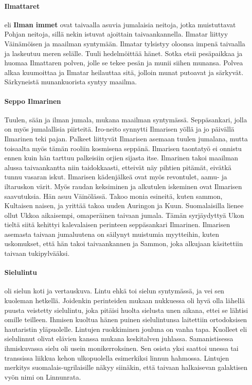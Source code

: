   \paragraph{Ilmattaret} eli \textbf{Ilman immet} ovat taivaalla asuvia jumalaisia neitoja, jotka 
    muistuttavat Pohjan neitoja, sillä nekin istuvat ajoittain taivaankannella. Ilmatar liittyy 
    Väinämöisen ja maailman syntymään. Ilmatar tylsistyy oloonsa impenä taivaalla ja laskeutuu 
    meren selälle. Tuuli hedelmöittää hänet. Sotka etsii pesäpaikkaa ja huomaa Ilmattaren polven, 
    jolle se tekee pesän ja munii siihen munansa. Polvea alkaa kuumoittaa ja Ilmatar heilauttaa 
    sitä, jolloin munat putoavat ja särkyvät. Särkyneistä munankuorista syntyy maailma. 
  \paragraph{Seppo Ilmarinen} Tuulen, sään ja ilman jumala, mukana maailman syntymässä. 
    Seppäsankari, jolla on myös jumalallisia piirteitä. Iro-neito synnytti Ilmarisen yöllä ja jo 
    päivällä Ilmarinen teki pajan. Palkeet liittyvät Ilmarisen asemaan tuulen jumalana, mutta 
    toisaalta myös tämän rooliin kosmisena seppänä. Ilmarisen taontatyö ei onnistu ennen kuin hän 
    tarttuu palkeisiin orjien sijasta itse.  Ilmarinen takoi maailman alussa taivaankantta niin 
    taidokkaasti, etteivät näy pihtien pitämät, eivätkä tunnu vasaran iskut. Ilmarisen 
    kädenjälkeä ovat myös revontulet, aamu- ja iltaruskon värit. Myös raudan keksiminen ja 
    alkutulen iskeminen ovat Ilmarisen saavutuksia. Hän asuu Väinölässä. Takoo monia esineitä, 
    kuten sammon, Kultaisen naisen, ja yrittää takoa uuden Auringon ja Kuun. Suomalaisilla lienee 
    ollut Ukkoa aikaisempi, omaperäinen taivaan jumala. Tämän syrjäydyttyä Ukon tieltä siitä 
    kehittyi kalevalaisen perinteen seppäsankari Ilmarinen. Ilmarisen asemasta taivaan 
    jumaluutena on säilynyt muistumia myytteihin, kuten uskomukset, että hän takoi taivaankannen 
    ja Sammon, joka alkujaan käsitettiin taivaan tukipylvääksi.
  \paragraph{Sielulintu} oli sielun koti ja vertauskuva. Lintu ehkä toi sielun syntymässä, ja 
    vei sen kuoleman hetkellä. Joidenkin perinteiden mukaan nukkuessa oli hyvä olla lähellä 
    puusta veistetty sielulintu, joka pitäisi huolta sielusta unen aikana, ettei se lähtisi 
    omille teilleen. Ihmisen kuoltua hänen puinen sielulintunsa laitettiin ortodoksisen 
    hautaristin yläpuolelle. Lintujen ruokkiminen jouluna on vanha tapa. Kuolleet eli 
    sielulinnut olivat elävien kanssa mukana keskitalven juhlassa. Samanistisessa ihmiskuvassa 
    sielu oli usein monikerroksinen. Sen osista yksi saattoi unessa tai transsissa liikkua 
    kehon ulkopuolella esimerkiksi linnun hahmossa. Lintujen merkitys suomalais-ugrilaisille 
    näkyy siinäkin, että taivaan halkaisevan galaktisen vyön nimi on Linnunrata. 
